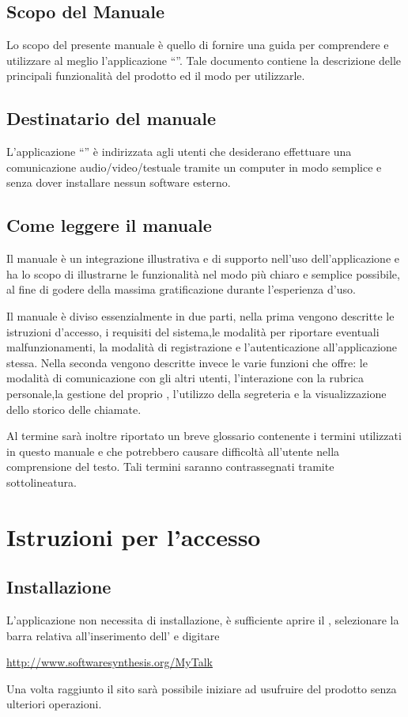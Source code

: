\subsection{Scopo del Manuale}
Lo scopo del presente manuale è quello di fornire una guida per comprendere e utilizzare al meglio l'applicazione ``\caName''.
Tale documento contiene la descrizione delle principali funzionalità del prodotto ed il modo
per utilizzarle.

\subsection{Destinatario del manuale}
L'applicazione  ``\caName'' è indirizzata agli utenti che desiderano effettuare una comunicazione audio/video/testuale tramite un computer in modo semplice  e senza dover installare nessun software esterno.  

\subsection{Come leggere il manuale}
Il manuale è un integrazione illustrativa e di supporto nell'uso dell'applicazione \caName{} e ha lo scopo di illustrarne le funzionalità nel modo più chiaro e semplice possibile, al fine di godere della massima gratificazione durante l'esperienza d'uso.

Il manuale è diviso essenzialmente in due parti, nella prima vengono descritte le istruzioni d'accesso, i requisiti del sistema,le modalità per riportare eventuali malfunzionamenti, la modalità di registrazione e l'autenticazione all'applicazione stessa. 
Nella seconda vengono descritte invece le varie funzioni che \caName{} offre: le modalità di comunicazione con gli altri utenti, l'interazione con la rubrica personale,la gestione del proprio \underline{}, l'utilizzo della segreteria e la visualizzazione dello storico delle chiamate.

Al termine sarà inoltre riportato un breve glossario contenente i termini utilizzati in questo manuale e che potrebbero causare difficoltà all'utente nella comprensione del testo. Tali termini saranno contrassegnati tramite sottolineatura. 

\section{Istruzioni per l'accesso}

\subsection{Installazione}
L'applicazione non necessita di installazione, è sufficiente aprire il , selezionare la barra relativa all'inserimento dell'\underline{} e digitare
\begin{center}
 \url{http://www.softwaresynthesis.org/MyTalk}
\end{center}
Una volta raggiunto il sito sarà possibile iniziare ad usufruire del prodotto senza ulteriori operazioni.

